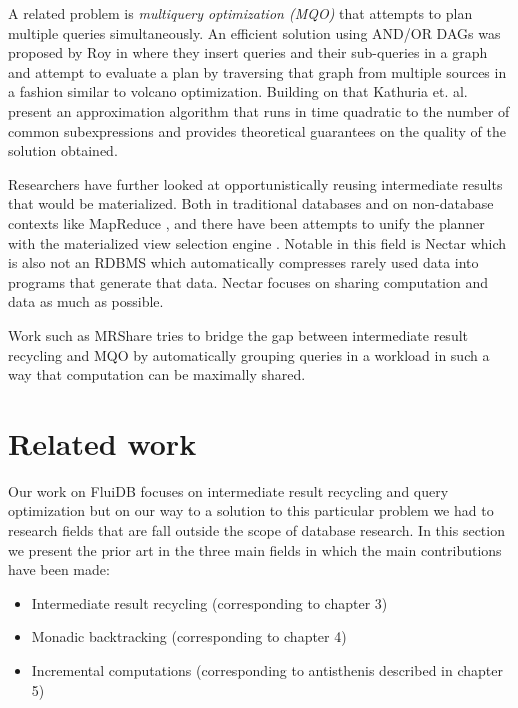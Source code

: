 A related problem is \emph{multiquery optimization (MQO)}
\cite{theodoratosDataWarehouseConfiguration1997} that attempts to plan
multiple queries simultaneously. An efficient solution using AND/OR
DAGs was proposed by Roy in
\cite{royEfficientExtensibleAlgorithms2000} where they insert queries
and their sub-queries in a graph and attempt to evaluate a plan by
traversing that graph from multiple sources in a fashion similar to
volcano optimization. Building on that Kathuria
et. al. \cite{kathuriaEfficientProvableMultiquery2017} present an
approximation algorithm that runs in time quadratic to the number of
common subexpressions and provides theoretical guarantees on the
quality of the solution obtained.

Researchers have further looked at opportunistically reusing
intermediate results that would be materialized. Both in traditional
databases
\cite{ivanovaArchitectureRecyclingIntermediates2010,nagelRecyclingPipelinedQuery2013}
and on non-database contexts like MapReduce
\cite{elghandourReStoreReusingResults2012a}, and there have been
attempts to unify the planner with the materialized view selection
engine \cite{perezHistoryawareQueryOptimization2014a}. Notable in this
field is Nectar \cite{gundaNectarAutomaticManagement2010} which is
also not an RDBMS which automatically compresses rarely used data into
programs that generate that data. Nectar focuses on sharing
computation and data as much as possible.

Work such as MRShare \cite{nykielMRShareSharingMultiple2010} tries to
bridge the gap between intermediate result recycling and MQO by
automatically grouping queries in a workload in such a way that
computation can be maximally shared.



\section{Related work}
\label{sec:org234bf3c}

Our work on FluiDB focuses on intermediate result recycling and query
optimization but on our way to a solution to this particular problem
we had to research fields that are fall outside the scope of database
research. In this section we present the prior art in the three main
fields in which the main contributions have been made:

\begin{itemize}
\item Intermediate result recycling (corresponding to chapter 3)
\item Monadic backtracking (corresponding to chapter 4)
\item Incremental computations (corresponding to antisthenis described in
chapter 5)
\end{itemize}

